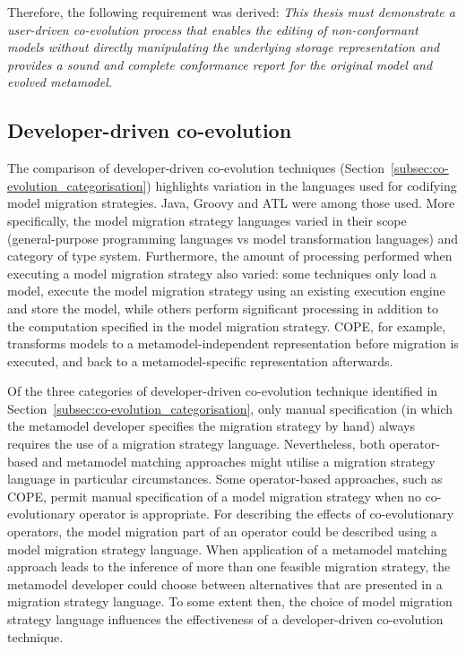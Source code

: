 Therefore, the following requirement was derived: \emph{This thesis must demonstrate a user-driven co-evolution process that enables the editing of non-conformant models without directly manipulating the underlying storage representation and provides a sound and complete conformance report for the original model and evolved metamodel.}


\subsection{Developer-driven co-evolution}
The comparison of developer-driven co-evolution techniques (Section~\ref{subsec:co-evolution_categorisation}) highlights variation in the languages used for codifying model migration strategies. Java, Groovy and ATL were among those used. More specifically, the model migration strategy languages varied in their scope (general-purpose programming languages vs model transformation languages) and category of type system. Furthermore, the amount of processing performed when executing a model migration strategy also varied: some techniques only load a model, execute the model migration strategy using an existing execution engine and store the model, while others perform significant processing in addition to the computation specified in the model migration strategy. COPE, for example, transforms models to a metamodel-independent representation before migration is executed, and back to a metamodel-specific representation afterwards.

Of the three categories of developer-driven co-evolution technique identified in Section~\ref{subsec:co-evolution_categorisation}, only manual specification (in which the metamodel developer specifies the migration strategy by hand) always requires the use of a migration strategy language. Nevertheless, both operator-based and metamodel matching approaches might utilise a migration strategy language in particular circumstances. Some operator-based approaches, such as COPE, permit manual specification of a model migration strategy when no co-evolutionary operator is appropriate. For describing the effects of co-evolutionary operators, the model migration part of an operator could be described using a model migration strategy language. When application of a metamodel matching approach leads to the inference of more than one feasible migration strategy, the metamodel developer could choose between alternatives that are presented in a migration strategy language. To some extent then, the choice of model migration strategy language influences the effectiveness of a developer-driven co-evolution technique.  

